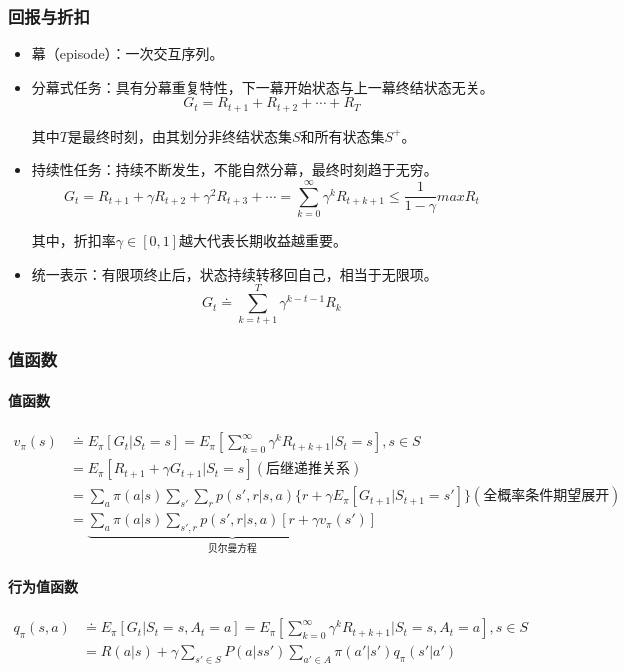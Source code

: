 \documentclass[
12pt, %
a4paper, 
oneside, %
headinclude,footinclude, %
]{scrartcl}
\begin{document}
\subsubsection{回报与折扣}
\begin{itemize}
\item 幕（episode）：一次交互序列。
\item 分幕式任务：具有分幕重复特性，下一幕开始状态与上一幕终结状态无关。
$$ G_t = R_{t + 1} + R_{t + 2} + \cdots + R_T $$

其中$ T $是最终时刻，由其划分非终结状态集$ S $和所有状态集$ S^+ $。
\item 持续性任务：持续不断发生，不能自然分幕，最终时刻趋于无穷。
$$ G_t = R_{t + 1} + \gamma R_{t + 2} + \gamma^2 R_{t + 3} + \cdots = \sum_{k = 0}^{\infty} \gamma^k R_{t + k + 1} \leq \frac{1}{1 - \gamma}max R_t $$

其中，折扣率$ \gamma \in [0, 1] $越大代表长期收益越重要。
\item 统一表示：有限项终止后，状态持续转移回自己，相当于无限项。
$$ G_t \doteq \sum_{k = t + 1}^{T} \gamma^{k - t - 1} R_k $$
\end{itemize}
\subsubsection{值函数}
\paragraph{值函数}
\begin{align*}
v_\pi(s) 
&\doteq E_\pi[G_t|S_t = s] = E_\pi[\sum_{k = 0}^{\infty} \gamma^k R_{t + k + 1}|S_t = s], s \in S \\
&= E_\pi[R_{t + 1} + \gamma G_{t+1}|S_t = s] (\text{后继递推关系}) \\
&= \sum_a \pi(a|s) \sum_{s'} \sum_r p(s', r|s, a)\{r + \gamma E_\pi[G_{t + 1}|S_{t + 1} = s']\} (\text{全概率条件期望展开}) \\
&= \underbrace{\sum_a \pi(a|s) \sum_{s', r} p(s', r|s, a)[r + \gamma v_\pi(s')]}_{\text{贝尔曼方程}}
\end{align*}
\paragraph{行为值函数}
\begin{align*} 
q_\pi(s, a) &\doteq E_\pi[G_t|S_t = s, A_t = a] = E_\pi[\sum_{k = 0}^{\infty} \gamma^k R_{t + k + 1}|S_t = s, A_t = a], s \in S \\
&= R(a|s) + \gamma \sum_{s' \in S} P(a|ss') \sum_{a' \in A} \pi(a'|s')q_{\pi}(s'|a')
\end{align*}
\end{document}
